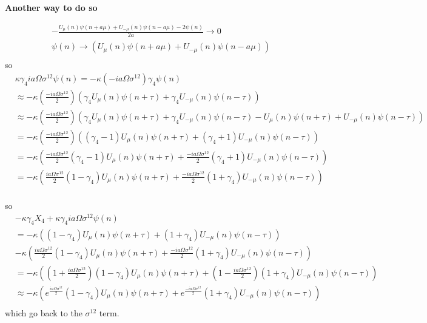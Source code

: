 \textcolor[rgb]{0,0,1}{\textbf{Another way to do so}}

\begin{equation}
\begin{split}
& -\frac{U_{\mu}(n)\psi(n+a\mu)+U_{-\mu}(n)\psi(n-a\mu)-2\psi (n)}{2a} \to 0\\
& \psi (n) \to  (U_{\mu}(n)\psi(n+a\mu)+U_{-\mu}(n)\psi(n-a\mu))\\
\end{split}
\end{equation}
so
\begin{equation}
\begin{split}
&\kappa \gamma _4 ia\Omega \sigma ^{12} \psi (n)=-\kappa  \left(-ia\Omega \sigma ^{12} \right)\gamma _4\psi (n)\\
&\approx -\kappa \left( \frac{ -ia\Omega \sigma ^{12}}{2}\right) ( \gamma _4 U_{\mu}(n) \psi (n+\tau) + \gamma _4 U_{-\mu}(n) \psi (n-\tau)) \\
&\approx -\kappa \left( \frac{ -ia\Omega \sigma ^{12}}{2}\right)  ( \gamma _4 U_{\mu}(n) \psi (n+\tau) + \gamma _4 U_{-\mu}(n) \psi (n-\tau) - U_{\mu}(n)\psi (n+\tau) + U_{-\mu}(n)\psi (n-\tau)) \\
&=-\kappa\left( \frac{ -ia\Omega \sigma ^{12}}{2}\right) \left((\gamma _4-1)U_{\mu}(n)\psi (n+\tau) +(\gamma _4+1) U_{-\mu}(n) \psi (n-\tau)\right)\\
&= -\kappa \left(\frac{-ia\Omega \sigma ^{12}}{2} (\gamma _4-1)U_{\mu}(n)\psi (n+\tau) + \frac{-ia\Omega \sigma ^{12}}{2} (\gamma _4+1) U_{-\mu}(n) \psi (n-\tau)\right)\\
&= -\kappa \left(\frac{ia\Omega \sigma ^{12}}{2} (1-\gamma _4)U_{\mu}(n)\psi (n+\tau) + \frac{-ia\Omega \sigma ^{12}}{2} (1+\gamma _4) U_{-\mu}(n) \psi (n-\tau)\right)\\
\end{split}
\end{equation}

so
\begin{equation}
\begin{split}
&-\kappa \gamma _4 X_4 +\kappa \gamma _4 ia\Omega \sigma ^{12} \psi (n)\\
&=-\kappa \left((1-\gamma _4)U_{\mu}(n)\psi (n+\tau) +(1+\gamma _4) U_{-\mu}(n) \psi (n-\tau)\right)\\
&-\kappa \left(\frac{ia\Omega \sigma ^{12}}{2} (1-\gamma _4)U_{\mu}(n)\psi (n+\tau) + \frac{-ia\Omega \sigma ^{12}}{2} (1+\gamma _4) U_{-\mu}(n) \psi (n-\tau)\right)\\
&=-\kappa \left(\left(1+\frac{ia\Omega \sigma ^{12}}{2}\right) (1-\gamma _4)U_{\mu}(n)\psi (n+\tau) + \left(1-\frac{ia\Omega \sigma ^{12}}{2}\right) (1+\gamma _4) U_{-\mu}(n) \psi (n-\tau)\right)\\
&\approx -\kappa \left(e^{\frac{ia\Omega \sigma ^{12}}{2}} (1-\gamma _4)U_{\mu}(n)\psi (n+\tau) + e^{\frac{-ia\Omega \sigma ^{12}}{2}} (1+\gamma _4) U_{-\mu}(n) \psi (n-\tau)\right)\\
\end{split}
\end{equation}
which go back to the $\sigma ^{12}$ term.

